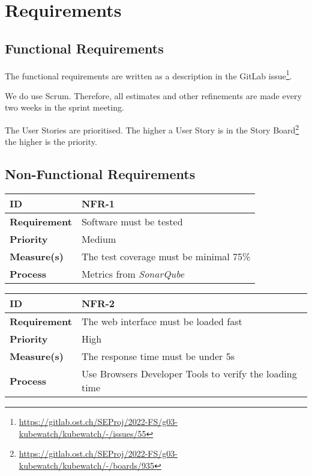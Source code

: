 \chapter{Requirements}



\section{Functional Requirements}
The functional requirements are written as a description in the GitLab issue\footnote{\url{https://gitlab.ost.ch/SEProj/2022-FS/g03-kubewatch/kubewatch/-/issues/55}}.

We do use Scrum.
Therefore, all estimates and other refinements are made every two weeks in the sprint meeting.

The User Stories are prioritised.
The higher a User Story is in the Story Board\footnote{\url{https://gitlab.ost.ch/SEProj/2022-FS/g03-kubewatch/kubewatch/-/boards/935}} the higher is the priority.



\section{Non-Functional Requirements}
\begin{center}
\begin{tabular}{ | m{8em} | m{25em}| } 
 \hline
 \textbf{ID} & NFR-1\\ 
 \hline
 \textbf{Requirement} & Software must be tested\\  
 \hline
 \textbf{Priority} & Medium\\
 \hline
 \textbf{Measure(s)} & The test coverage must be minimal 75\%\\
 \hline
 \textbf{Process} & Metrics from \textsl{SonarQube}\\
 \hline
\end{tabular}
\end{center}

\begin{center}
\begin{tabular}{ | m{8em} | m{25em}| } 
 \hline
 \textbf{ID} & NFR-2\\ 
 \hline
 \textbf{Requirement} & The web interface must be loaded fast\\
 \hline
 \textbf{Priority} & High\\
 \hline
 \textbf{Measure(s)} & The response time must be under 5s\\
 \hline
 \textbf{Process} & Use Browsers Developer Tools to verify the loading time\\
 \hline
\end{tabular}
\end{center}

